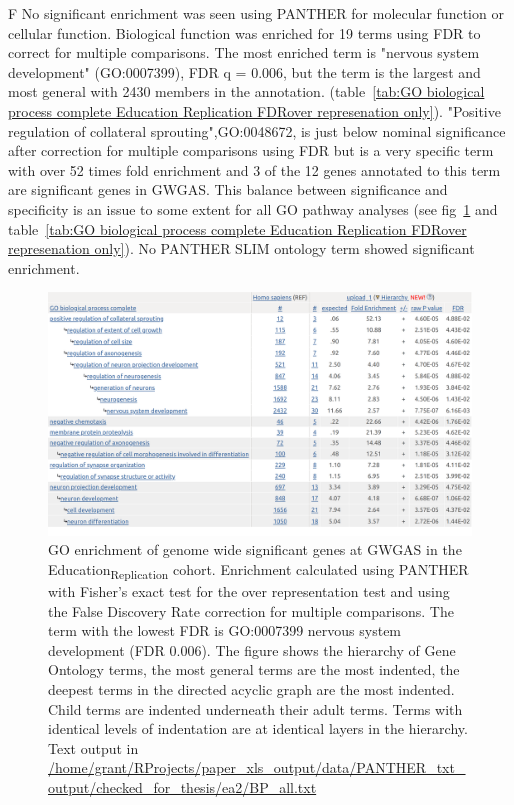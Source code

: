 F No significant enrichment was seen using PANTHER for molecular function or cellular function. Biological function was enriched for 19 terms using FDR to correct for multiple comparisons. The most enriched term is "nervous system development" (GO:0007399), FDR q = 0.006, but the term is the largest and most general with 2430 members in the annotation. (table~\ref{tab:GO biological process complete Education Replication FDRover represenation only}). "Positive regulation of collateral sprouting",GO:0048672, is just below nominal significance after correction for multiple comparisons using FDR but is a very specific term with over 52 times fold enrichment and 3 of the 12 genes annotated to this term are significant genes in GWGAS. This balance between significance and specificity is an issue to some extent for all GO pathway analyses (see fig~\ref{tab:GO biological process complete Education Replication FDR} and table~\ref{tab:GO biological process complete Education Replication FDRover represenation only}). No PANTHER SLIM ontology term showed significant enrichment. 

 \begin{figure}
     \centering
     \includegraphics[width=\textwidth]{images/chapter2/large_screenshots/edu_replication_large_bp_panther.png}
     \caption[GO enrichment PANTHER Biological Process Education\textsubscript{Replication}]{GO enrichment of genome wide significant genes at GWGAS in the Education\textsubscript{Replication} cohort. Enrichment calculated
     using PANTHER with Fisher's exact test for the over representation test and using the False Discovery Rate correction for multiple comparisons. The term with the lowest FDR is GO:0007399 nervous system development (FDR 0.006). The figure shows the hierarchy of Gene Ontology terms, the most general terms are the most indented, the deepest terms in the directed acyclic graph are the most indented. Child terms are indented underneath their adult terms. Terms with identical levels of indentation are at identical layers in the hierarchy. Text output in \url{/home/grant/RProjects/paper_xls_output/data/PANTHER_txt_output/checked_for_thesis/ea2/BP_all.txt}}%
     
     \label{tab:GO biological process complete Education Replication FDR}
 \end{figure}


